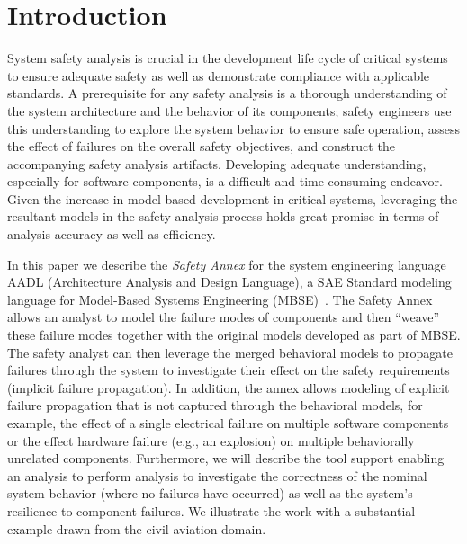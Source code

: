 \section{Introduction}
\label{sec:intro}

System safety analysis is crucial in the development life cycle of critical systems to ensure adequate safety as well as demonstrate compliance with applicable standards. A prerequisite for any safety analysis is a thorough understanding of the system architecture and the behavior of its components; safety engineers use this understanding to explore the system behavior to ensure safe operation, assess the effect of failures on the overall safety objectives, and construct the accompanying safety analysis artifacts. Developing adequate understanding, especially for software components, is a difficult and time consuming endeavor. Given the increase in model-based development in critical systems, leveraging the resultant models in the safety analysis process holds great promise in terms of analysis accuracy as well as efficiency.

In this paper we describe the \emph{Safety Annex} for the system engineering language AADL (Architecture Analysis and Design Language), a SAE Standard modeling language for Model-Based Systems Engineering (MBSE)~\cite{AADL_Standard}. The Safety Annex allows an analyst to model the failure modes of components and then ``weave'' these failure modes together with the original models developed as part of MBSE. The safety analyst can then leverage the merged behavioral models to propagate failures through the system to investigate their effect on the safety requirements (implicit failure propagation). In addition, the annex allows modeling of explicit failure propagation that is not captured through the behavioral models, for example, the effect of a single electrical failure on multiple software components or the effect hardware failure (e.g., an explosion) on multiple behaviorally unrelated components. Furthermore, we will describe the tool support enabling an analysis to perform analysis to investigate the correctness of the nominal system behavior (where no failures have occurred) as well as the system's resilience to component failures. We illustrate the work with a substantial example drawn from the civil aviation domain.

